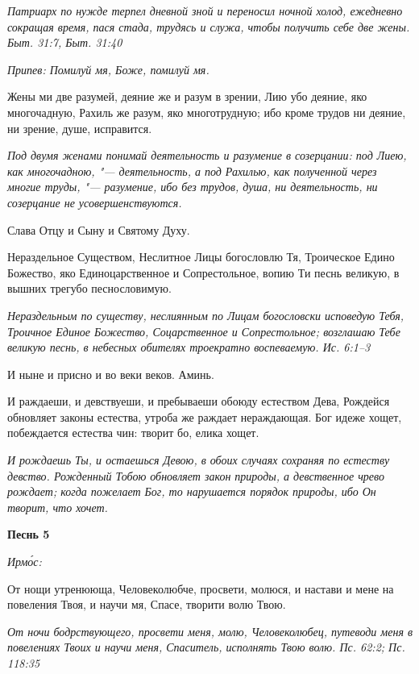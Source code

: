 \itshape Патриарх по нужде терпел дневной зной и переносил ночной холод, ежедневно сокращая время, пася стада, трудясь и служа, чтобы получить себе две жены. Быт. 31:7, Быт. 31:40\normalfont{}


\itshape Припев:\normalfont{} Помилуй мя, Боже, помилуй мя.


Жены ми две разумей, деяние же и разум в зрении, Лию убо деяние, яко многочадную, Рахиль же разум, яко многотрудную; ибо кроме трудов ни деяние, ни зрение, душе, исправится.


\itshape Под двумя женами понимай деятельность и разумение в созерцании: под Лиею, как многочадною, "--- деятельность, а под Рахилью, как полученной через многие труды, "--- разумение, ибо без трудов, душа, ни деятельность, ни созерцание не усовершенствуются.\normalfont{}


Слава Отцу и Сыну и Святому Духу.


Нераздельное Существом, Неслитное Лицы богословлю Тя, Троическое Едино Божество, яко Единоцарственное и Сопрестольное, вопию Ти песнь великую, в вышних трегубо песнословимую.


\itshape Нераздельным по существу, неслиянным по Лицам богословски исповедую Тебя, Троичное Единое Божество, Соцарственное и Сопрестольное; возглашаю Тебе великую песнь, в небесных обителях троекратно воспеваемую. Ис. 6:1–3\normalfont{}


И ныне и присно и во веки веков. Аминь.


И раждаеши, и девствуеши, и пребываеши обоюду естеством Дева, Рождейся обновляет законы естества, утроба же раждает нераждающая. Бог идеже хощет, побеждается естества чин: творит бо, елика хощет.


\itshape И рождаешь Ты, и остаешься Девою, в обоих случаях сохраняя по естеству девство. Рожденный Тобою обновляет закон природы, а девственное чрево рождает; когда пожелает Бог, то нарушается порядок природы, ибо Он творит, что хочет.\normalfont{}





\bfseries Песнь 5\normalfont{}


\itshape Ирмо́с:\normalfont{}


От нощи утренююща, Человеколюбче, просвети, молюся, и настави и мене на повеления Твоя, и научи мя, Спасе, творити волю Твою.


\itshape От ночи бодрствующего, просвети меня, молю, Человеколюбец, путеводи меня в повелениях Твоих и научи меня, Спаситель, исполнять Твою волю. Пс. 62:2; Пс. 118:35\normalfont{}


